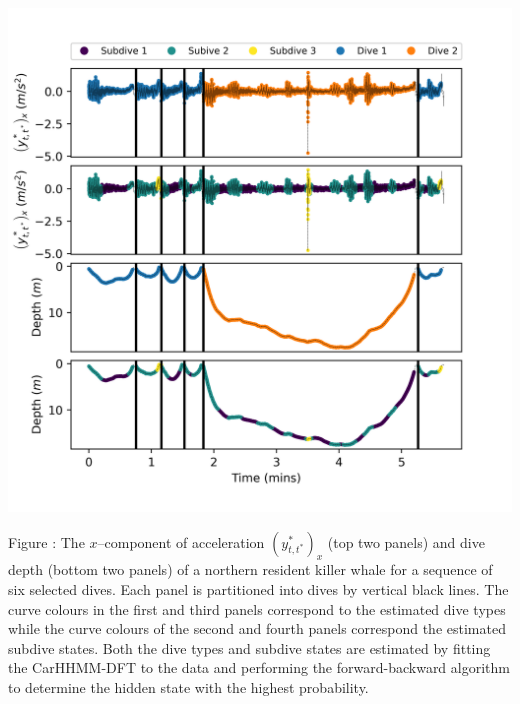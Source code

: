 \documentclass{article}
\begin{document}
        \begin{center}
        \includegraphics[width=6in]{../Plots/2019/20190902-182840-CATs_OB_1_0_267_CarHHMM2_decoded_dives.png}
        \end{center}
        
        \noindent Figure : The $x$--component of acceleration $(y^*_{t,t^*})_x$ (top two panels) and dive depth (bottom two panels) of a northern resident killer whale for a sequence of six selected dives. Each panel is partitioned into dives by vertical black lines. The curve colours in the first and third panels correspond to the estimated dive types while the curve colours of the second and fourth panels correspond the estimated subdive states. Both the dive types and subdive states are estimated by fitting the CarHHMM-DFT to the data and performing the forward-backward algorithm to determine the hidden state with the highest probability.
        \addtocounter{fignum}{1}
        
\end{document}
